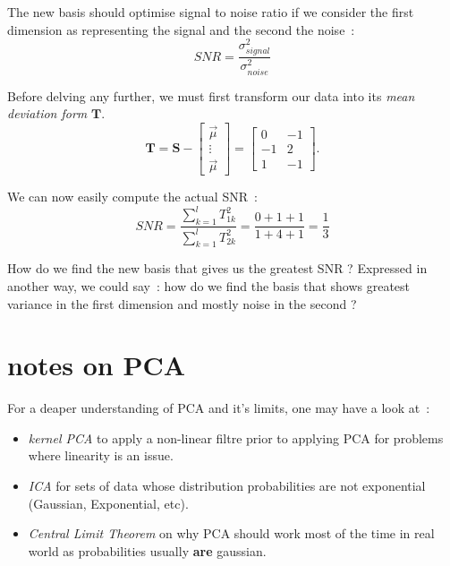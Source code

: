 \documentclass[11pt,twocolumn]{amsart} %
\begin{document}
The new basis should optimise signal to noise ratio if we consider the first dimension as representing the signal and the second the noise~:
\begin{equation*}
  SNR = \frac{\sigma_{signal}^2}{\sigma_{noise}^2}
\end{equation*}

Before delving any further, we must first transform our data into its \emph{mean deviation form} $\textbf{T}$. 
\begin{equation*}
  \textbf{T} = \textbf{S} - \begin{bmatrix}\vec{\mu} \\ \vdots \\ \vec{\mu}\end{bmatrix} = \begin{bmatrix} 0 & -1 \\ -1 & 2 \\ 1 & -1\end{bmatrix}.
\end{equation*}

We can now easily compute the actual SNR~:
\begin{equation*}
  SNR = \frac{\sum_{k=1}^l T_{1k}^2}{\sum_{k=1}^l T_{2k}^2} = \frac{0+1+1}{1+4+1} = \frac{1}{3}
\end{equation*}

How do we find the new basis that gives us the greatest SNR ? Expressed in another way, we could say~: how do we find the basis that shows greatest variance in the first dimension and mostly noise in the second ?

\section{notes on PCA}

For a deaper understanding of PCA and it's limits, one may have a look at~:
\begin{itemize}
  \item \emph{kernel PCA} to apply a non-linear filtre prior to applying PCA for problems where linearity is an issue.
  \item \emph{ICA} for sets of data whose distribution probabilities are not exponential (Gaussian, Exponential, etc).
  \item \emph{Central Limit Theorem} on why PCA should work most of the time in real world as probabilities usually \textbf{are} gaussian.
\end{itemize}

\onecolumn
\end{document}
